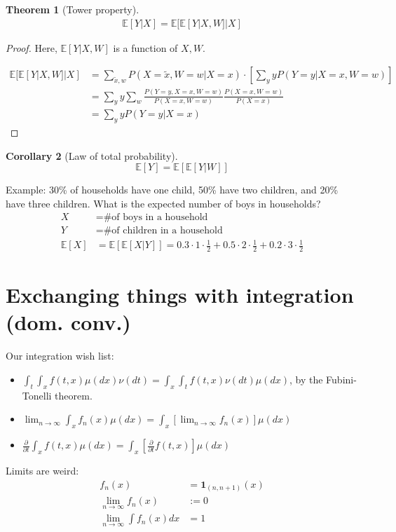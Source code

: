 \documentclass{article}
\newtheorem{thm}{Theorem}[section]
\newtheorem{cor}[thm]{Corollary}
\newcommand{\E}{\mathbb{E}}
\begin{document}
\begin{thm}[Tower property]
\begin{align*}
  \E[Y | X] = \E[\E[Y | X, W] | X]
\end{align*}
\end{thm}
\begin{proof}
  Here, $\E[Y | X, W]$ is a function of $X, W$. 

  \begin{align*}
    \E[\E[Y | X, W] | X] &= \sum_{\tilde{x}, w} P(X = \tilde{x}, W = w | X = x)
    \cdot \left[ \sum_y yP(Y = y | X = x, W = w)\right] \\
    &= \sum_y y \sum_w \frac{P(Y = y, X = x, W = w)}{P(X = x, W = w)}  \frac{P(X =
    x, W = w)}{P(X = x)} \\
    &= \sum_y y P(Y = y | X = x)
  \end{align*}
\end{proof}
\begin{cor}[Law of total probability]
  \[\E[Y] = \E[\E[Y | W]]\]
\end{cor}
Example: 30\% of households have one child, 50\% have two children, and 20\% have
three children. What is the expected number of boys in households?
\begin{align*}
  X &= \text{\# of boys in a household} \\
  Y &= \text{\# of children in a household} \\
  \E[X] &= \E[\E[X | Y]]= 0.3 \cdot 1 \cdot \frac{1}{2} + 0.5 \cdot 2 \cdot
  \frac{1}{2} + 0.2 \cdot 3 \cdot \frac{1}{2}
\end{align*}

\section{Exchanging things with integration (dom. conv.)}
Our integration wish list:
\begin{itemize}
  \item $\int_t \int_x f(t, x) \mu(dx) \nu(dt) = \int_x \int_t f(t, x) \nu(dt)
    \mu(dx)$, by the Fubini-Tonelli theorem.
  \item $\lim_{n \rightarrow \infty} \int_x f_n(x) \mu(dx) = \int_x \left[
    \lim_{n \rightarrow \infty} f_n(x) \right] \mu(dx)$
  \item $\frac{\partial}{\partial t} \int_x f(t, x) \mu(dx) = \int_x
    \left[\frac{\partial}{\partial t} f(t, x)\right] \mu(dx)$
\end{itemize}

Limits are weird:
\begin{align*}
  f_n(x) &= \mathbf{1}_{(n, n+1)}(x) \\
  \lim_{n \rightarrow \infty} f_n(x) &:= 0 \\
  \lim_{n \rightarrow \infty} \int f_n(x) dx &= 1
\end{align*}
\end{document}
